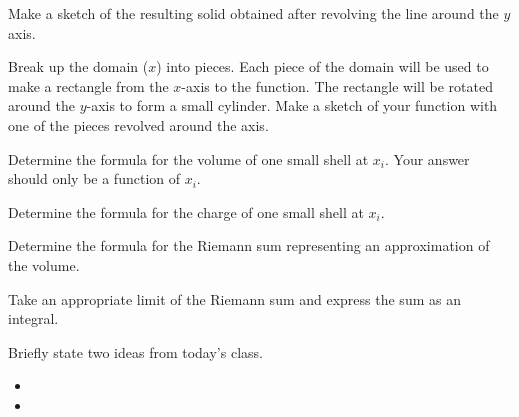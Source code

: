 \begin{problem}
\begin{subproblem}
         \item Make a sketch of the resulting solid obtained after
           revolving the line around the $y$ axis.
           \vfill

         \item Break up the domain ($x$) into pieces. Each piece of the domain will be used to make a rectangle
              from the $x$-axis to the function. The rectangle will be rotated around the $y$-axis to form a small cylinder.
              Make a sketch of your function with one of the pieces revolved around the axis.
           \vfill

         \clearpage

         \item Determine the formula for the volume of one small shell at $x_i$. Your answer should only be a function of $x_i$.
           \vfill

         \item Determine the formula for the charge of one small shell at $x_i$.
           \vfill

         \item Determine the formula for the Riemann sum representing an approximation of the volume.
           \vfill

         \item Take an appropriate limit of the Riemann sum and express the sum as an integral.
           \vfill

       \end{subproblem}
\end{problem}

\postClass

\begin{problem}
\item Briefly state two ideas from today's class.
  \begin{itemize}
  \item
  \item
  \end{itemize}
\item
  \begin{subproblem}
    \item
  \end{subproblem}
\end{problem}




